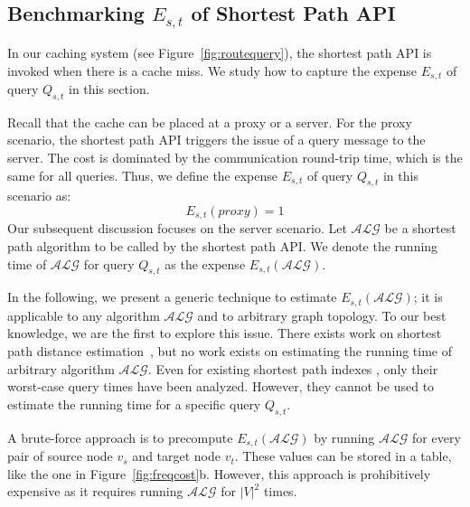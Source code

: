 \documentclass{sig-alternate}
\begin{document}
\subsection{Benchmarking {\large $E_{s,t}$} of Shortest Path API}\label{sec:benchmark}
%
In our caching system (see Figure~\ref{fig:routequery}),
the shortest path API is invoked when there is a cache miss.
We study how to capture the expense $E_{s,t}$ of query $Q_{s,t}$ in this section.




Recall that the cache can be placed at a proxy or a server.
For the proxy scenario, the shortest path API triggers the issue of a query message to the server.
The cost is dominated by the communication round-trip time, which is the same for all queries.
Thus, we define the expense $E_{s,t}$ of query $Q_{s,t}$ in this scenario as:
\begin{equation}
E_{s,t}(proxy) = 1
\end{equation}
Our subsequent discussion focuses on the server scenario.
Let $\mathcal{ALG}$ be a shortest path algorithm to be called by the shortest path API.
We denote the running time of $\mathcal{ALG}$ for query $Q_{s,t}$
as the expense $E_{s,t}(\mathcal{ALG})$.


In the following, we present a generic technique to estimate $E_{s,t}(\mathcal{ALG})$;
it is applicable to any algorithm $\mathcal{ALG}$ and to arbitrary graph topology.
To our best knowledge, we are the first to explore this issue.
There exists work on shortest path distance estimation~\cite{Potamias09},
but no work exists on estimating the running time of arbitrary algorithm $\mathcal{ALG}$.
%
Even for existing shortest path indexes \cite{HuLL06,SametSA08,Kriegel08,jung02,Wei10},
only their worst-case query times have been analyzed.
However, they cannot be used to estimate the running time for a specific query $Q_{s,t}$.



A brute-force approach is to precompute $E_{s,t}(\mathcal{ALG})$
by running $\mathcal{ALG}$ for every pair of source node $v_s$ and target node $v_t$.
These values can be stored in a table, like the one in Figure~\ref{fig:freqcost}b.
However, this approach is prohibitively expensive as it requires running $\mathcal{ALG}$ for $|V|^2$ times.
\end{document}
